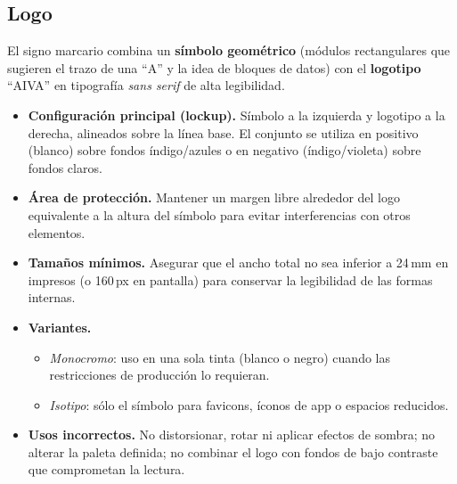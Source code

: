 \subsection{Logo}
El signo marcario combina un \textbf{símbolo geométrico} (módulos rectangulares que sugieren el trazo de una “A” y la idea de bloques de datos) con el \textbf{logotipo} “AIVA” en tipografía \textit{sans serif} de alta legibilidad.

\begin{itemize}
    \item \textbf{Configuración principal (lockup).} Símbolo a la izquierda y logotipo a la derecha, alineados sobre la línea base. El conjunto se utiliza en positivo (blanco) sobre fondos índigo/azules o en negativo (índigo/violeta) sobre fondos claros.
    \item \textbf{Área de protección.} Mantener un margen libre alrededor del logo equivalente a la altura del símbolo para evitar interferencias con otros elementos.
    \item \textbf{Tamaños mínimos.} Asegurar que el ancho total no sea inferior a 24\,mm en impresos (o 160\,px en pantalla) para conservar la legibilidad de las formas internas.
    \item \textbf{Variantes.} 
    \begin{itemize}
        \item \textit{Monocromo}: uso en una sola tinta (blanco o negro) cuando las restricciones de producción lo requieran.
        \item \textit{Isotipo}: sólo el símbolo para favicons, íconos de app o espacios reducidos.
    \end{itemize}
    \item \textbf{Usos incorrectos.} No distorsionar, rotar ni aplicar efectos de sombra; no alterar la paleta definida; no combinar el logo con fondos de bajo contraste que comprometan la lectura.
\end{itemize}

\vspace{1cm}